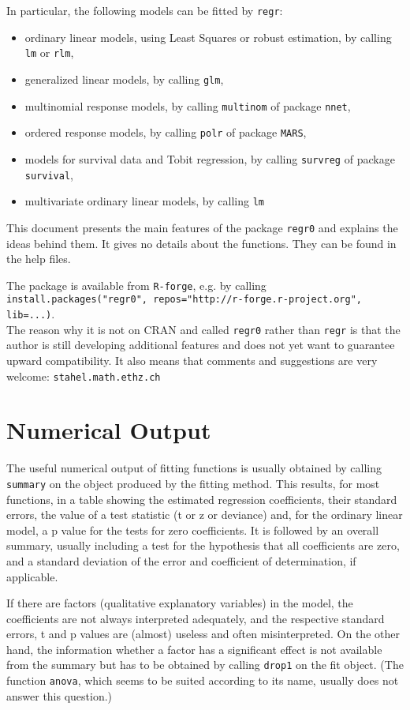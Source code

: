 \documentclass{article}
\providecommand{\T}{\texttt}
\begin{document}
In particular, the following models can be fitted by \T{regr}:
\begin{itemize}
\item 
  ordinary linear models, using Least Squares or robust estimation,
  by calling \T{lm} or \T{rlm},
\item
  generalized linear models, by calling \T{glm},
\item
  multinomial response models, by calling \T{multinom} of package
  \T{nnet},
\item
  ordered response models, by calling \T{polr} of package
  \T{MARS},
\item
  models for survival data and Tobit regression, by calling
  \T{survreg} of package \T{survival},
\item
  multivariate ordinary linear models, by calling \T{lm}
\end{itemize}

This document presents the main features of the package \T{regr0}
and explains the ideas behind them. 
It gives no details about the functions. They can be found in
the help files.

The package is available from \T{R-forge}, e.g. by calling\\
\T{install.packages("regr0", repos="http://r-forge.r-project.org",
  lib=...)}.\\
The reason why it is not on CRAN and called \T{regr0} rather than 
\T{regr} is that the author is still developing additional features and
does not yet want to guarantee upward compatibility.
It also means that comments and suggestions are very welcome:
\T{stahel\@stat.math.ethz.ch}

\section{Numerical Output}
The useful numerical output of fitting functions is usually obtained by
calling \T{summary} on the object produced by the fitting method.
This results, for most functions, in a table showing the estimated
regression coefficients, their standard errors, the value of a test
statistic (t or z or deviance) and, for the 
ordinary linear model, a p value for the tests for zero coefficients. 
It is followed by an overall summary, usually including a test for
the hypothesis that all coefficients are zero, and a standard deviation of
the error and coefficient of determination, if applicable.

If there are factors (qualitative explanatory variables) in the model, 
the coefficients are not always interpreted adequately, and the 
respective standard errors, t and p values are (almost) useless and often
misinterpreted. 
On the other hand, the information whether a factor has a significant
effect is not available from the summary but has to be obtained by calling 
\T{drop1} on the fit object. 
(The function \T{anova}, which seems to be suited according to its
name, usually does not answer this question.)
\end{document}
